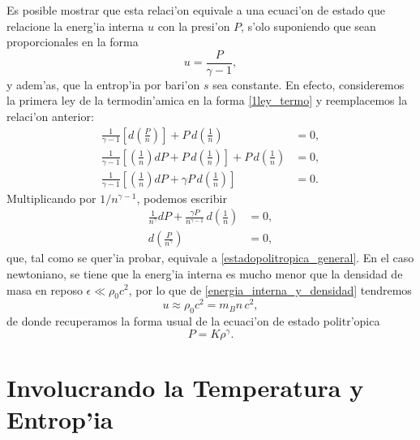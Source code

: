 Es posible mostrar que esta relaci'on equivale a una ecuaci'on de estado que relacione la energ'ia interna $u$ con la presi'on $P$, s'olo suponiendo que sean proporcionales en la forma
\begin{equation}\label{estadopolitropica_alterna}
\boxed{ u=\frac{P}{\gamma-1},}
\end{equation}
y adem'as, que la entrop'ia por bari'on $s$ sea constante. En efecto, consideremos la primera ley de la termodin'amica en la forma \eqref{1ley_termo} y reemplacemos la relaci'on anterior:
\begin{align}
 \frac{1}{\gamma-1}\left[d\left(\frac{P}{n}\right)\right]+P\,d\left(\frac{1}{n}\right)&=0,\\
\frac{1}{\gamma-1}\left[\left(\frac{1}{n}\right)dP+P\,d\left(\frac{1}{n}\right)\right]+P\,d\left(\frac{1}{n}\right)&=0,\\
\frac{1}{\gamma-1}\left[\left(\frac{1}{n}\right)dP+\gamma P\, d\left(\frac{1}{n}\right)\right]&=0.
\end{align}
Multiplicando por $1/n^{\gamma-1}$, podemos escribir
\begin{align}
\frac{1}{n^{\gamma}}dP+\frac{\gamma P}{n^{\gamma-1}}\,d\left(\frac{1}{n}\right)&=0,\\
d\left(\frac{P}{n^{\gamma}}\right)&=0,
\end{align}
que, tal como se quer'ia probar, equivale a \eqref{estadopolitropica_general}. En el caso newtoniano, se tiene que la energ'ia interna es mucho menor que la densidad de masa en reposo $\epsilon\ll \rho_0 c^2$, por lo que de \eqref{energia_interna_y_densidad} tendremos
\begin{equation}
u\approx \rho_0c^2=m_Bn\,c^2,
\end{equation}
de donde recuperamos la forma usual de la ecuaci'on de estado politr'opica
\begin{equation}\label{estadopolitropica}
 \boxed{P=K\rho^{\gamma}.}
\end{equation}

\section{Involucrando la Temperatura y Entrop'ia}

